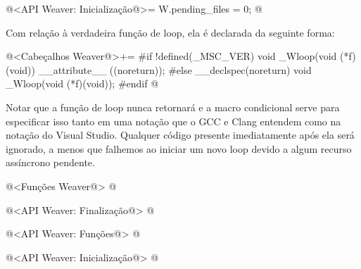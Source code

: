 \iniciocodigo
@<API Weaver: Inicialização@>=
W.pending_files = 0;
@
\fimcodigo

Com relação à verdadeira função de loop, ela é declarada da seguinte
forma:

\iniciocodigo
@<Cabeçalhos Weaver@>+=
#if !defined(_MSC_VER)
void _Wloop(void (*f)(void)) __attribute__ ((noreturn));
#else
__declspec(noreturn) void _Wloop(void (*f)(void));
#endif
@
\fimcodigo

Notar que a função de loop nunca retornará e a macro condicional serve
para especificar isso tanto em uma notação que o GCC e Clang entendem
como na notação do Visual Studio. Qualquer código presente
imediatamente após ela será ignorado, a menos que falhemos ao iniciar
um novo loop devido a algum recurso assíncrono pendente.






@<Funções Weaver@>
@

@<API Weaver: Finalização@>
@

@<API Weaver: Funções@>
@

@<API Weaver: Inicialização@>
@


\fim
